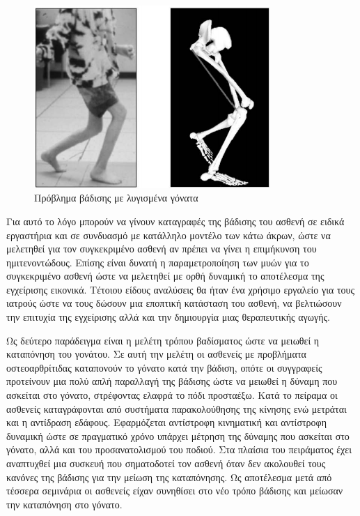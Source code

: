 \begin{figure}[H]
    \centering
    \includegraphics[width=0.8\textwidth, keepaspectratio]{fig/crouch-gait.png}
    \caption{Πρόβλημα βάδισης με λυγισμένα γόνατα \cite{arnolda06}}
    \label{fig:crouch-gait}
\end{figure}

Για αυτό το λόγο μπορούν να γίνουν καταγραφές της βάδισης του ασθενή σε ειδικά εργαστήρια και σε συνδυασμό με κατάλληλο μοντέλο των κάτω άκρων, ώστε να μελετηθεί για τον συγκεκριμένο ασθενή αν πρέπει να γίνει η επιμήκυνση του ημιτενοντώδους. Επίσης είναι δυνατή η παραμετροποίηση των μυών για το συγκεκριμένο ασθενή ώστε να μελετηθεί με ορθή δυναμική το αποτέλεσμα της εγχείρισης εικονικά. Τέτοιου είδους αναλύσεις θα ήταν ένα χρήσιμο εργαλείο για τους ιατρούς ώστε να τους δώσουν μια εποπτική κατάσταση του ασθενή, να βελτιώσουν την επιτυχία της εγχείρισης αλλά και την δημιουργία μιας θεραπευτικής αγωγής.

Ως δεύτερο παράδειγμα \cite{fregly07} είναι η μελέτη τρόπου βαδίσματος ώστε να μειωθεί η καταπόνηση του γονάτου. Σε αυτή την μελέτη οι ασθενείς με προβλήματα οστεοαρθρίτιδας καταπονούν το γόνατο κατά την βάδιση, οπότε οι συγγραφείς προτείνουν μια πολύ απλή παραλλαγή της βάδισης ώστε να μειωθεί η δύναμη που ασκείται στο γόνατο, στρέφοντας ελαφρά το πόδι προσταέξω. Κατά το πείραμα οι ασθενείς καταγράφονται από συστήματα παρακολούθησης της κίνησης ενώ μετράται και η αντίδραση εδάφους. Εφαρμόζεται αντίστροφη κινηματική και αντίστροφη δυναμική ώστε σε πραγματικό χρόνο υπάρχει μέτρηση της δύναμης που ασκείται στο γόνατο, αλλά και του προσανατολισμού του ποδιού. Στα πλαίσια του πειράματος έχει αναπτυχθεί μια συσκευή που σηματοδοτεί τον ασθενή όταν δεν ακολουθεί τους κανόνες της βάδισης για την μείωση της καταπόνησης. Ως αποτέλεσμα μετά από τέσσερα σεμινάρια οι ασθενείς είχαν συνηθίσει στο νέο τρόπο βάδισης και μείωσαν την καταπόνηση στο γόνατο.

